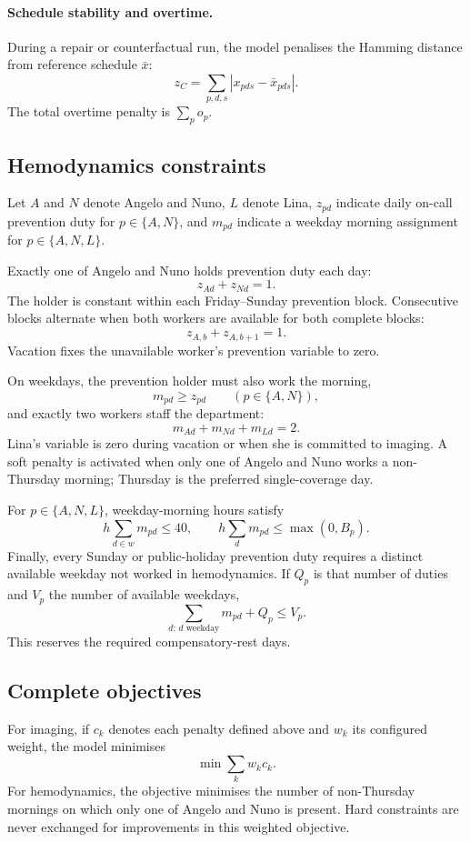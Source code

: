 \documentclass[11pt,a4paper]{article}
\begin{document}
\paragraph{Schedule stability and overtime.}
During a repair or counterfactual run, the model penalises the Hamming distance from reference schedule $\bar{x}$:
\[
 z_C=\sum_{p,d,s}|x_{pds}-\bar{x}_{pds}|.
\]
The total overtime penalty is $\sum_po_p$.

\subsection{Hemodynamics constraints}

Let $A$ and $N$ denote Angelo and Nuno, $L$ denote Lina, $z_{pd}$ indicate daily on-call prevention duty for $p\in\{A,N\}$, and $m_{pd}$ indicate a weekday morning assignment for $p\in\{A,N,L\}$.

Exactly one of Angelo and Nuno holds prevention duty each day:
\[
 z_{Ad}+z_{Nd}=1.
\]
The holder is constant within each Friday--Sunday prevention block. Consecutive blocks alternate when both workers are available for both complete blocks:
\[
 z_{A,b}+z_{A,b+1}=1.
\]
Vacation fixes the unavailable worker's prevention variable to zero.

On weekdays, the prevention holder must also work the morning,
\[
 m_{pd}\geq z_{pd}\qquad(p\in\{A,N\}),
\]
and exactly two workers staff the department:
\[
 m_{Ad}+m_{Nd}+m_{Ld}=2.
\]
Lina's variable is zero during vacation or when she is committed to imaging. A soft penalty is activated when only one of Angelo and Nuno works a non-Thursday morning; Thursday is the preferred single-coverage day.

For $p\in\{A,N,L\}$, weekday-morning hours satisfy
\[
 h\sum_{d\in w}m_{pd}\leq40,
 \qquad
 h\sum_dm_{pd}\leq\max(0,B_p).
\]
Finally, every Sunday or public-holiday prevention duty requires a distinct available weekday not worked in hemodynamics. If $Q_p$ is that number of duties and $V_p$ the number of available weekdays,
\[
 \sum_{d:\,d\text{ weekday}}m_{pd}+Q_p\leq V_p.
\]
This reserves the required compensatory-rest days.

\subsection{Complete objectives}

For imaging, if $c_k$ denotes each penalty defined above and $w_k$ its configured weight, the model minimises
\[
 \min\sum_kw_kc_k.
\]
For hemodynamics, the objective minimises the number of non-Thursday mornings on which only one of Angelo and Nuno is present. Hard constraints are never exchanged for improvements in this weighted objective.
\end{document}
